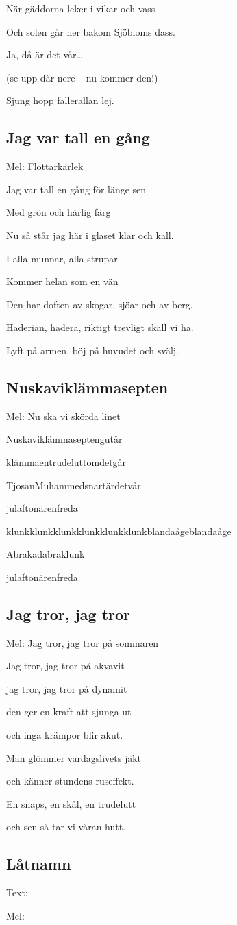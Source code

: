 När gäddorna leker i vikar och vass

Och solen går ner bakom Sjöbloms dass.

Ja, då är det vår…

(se upp där nere – nu kommer den!)

Sjung hopp fallerallan lej.

\subsection{\textbf{Jag var tall en gång}}

Mel: Flottarkärlek\bigskip

Jag var tall en gång för länge sen

Med grön och härlig färg

Nu så står jag här i glaset klar och kall.

I alla munnar, alla strupar

Kommer helan som en vän

Den har doften av skogar, sjöar och av berg.

Haderian, hadera, riktigt trevligt skall vi ha.

Lyft på armen, böj på huvudet och svälj.

\subsection{\textbf{Nuskaviklämmasepten}}

Mel: Nu ska vi skörda linet\bigskip

Nuskaviklämmaseptengutår

klämmaentrudeluttomdetgår

TjosanMuhammedsnartärdetvår

julaftonärenfreda

klunkklunkklunkklunkklunkklunkblandaågeblandaåge

Abrakadabraklunk

julaftonärenfreda

\subsection{\textbf{Jag tror, jag tror}}

Mel: Jag tror, jag tror på sommaren \bigskip

Jag tror, jag tror på akvavit

jag tror, jag tror på dynamit

den ger en kraft att sjunga ut

och inga krämpor blir akut.

Man glömmer vardagslivets jäkt

och känner stundens ruseffekt.

En snaps, en skål, en trudelutt

och sen så tar vi våran hutt.


\subsection{\textbf{Låtnamn}}

Text:

Mel: \bigskip

\newpage